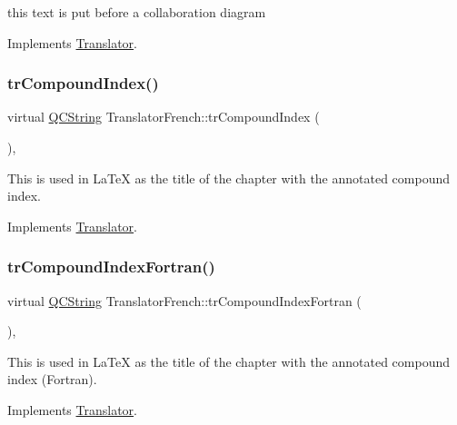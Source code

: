 this text is put before a collaboration diagram 

Implements \mbox{\hyperlink{class_translator}{Translator}}.

\mbox{\label{class_translator_french_ae4a5ec770e1f655200ba2b82a2a1a59b}} 
\subsubsection{\texorpdfstring{trCompoundIndex()}{trCompoundIndex()}}
{\footnotesize\ttfamily virtual \mbox{\hyperlink{class_q_c_string}{Q\+C\+String}} Translator\+French\+::tr\+Compound\+Index (\begin{DoxyParamCaption}{ }\end{DoxyParamCaption})\hspace{0.3cm}{\ttfamily [inline]}, {\ttfamily [virtual]}}

This is used in La\+TeX as the title of the chapter with the annotated compound index. 

Implements \mbox{\hyperlink{class_translator}{Translator}}.

\mbox{\label{class_translator_french_af860f0f85d95e8ce648d7bc44324b022}} 
\subsubsection{\texorpdfstring{trCompoundIndexFortran()}{trCompoundIndexFortran()}}
{\footnotesize\ttfamily virtual \mbox{\hyperlink{class_q_c_string}{Q\+C\+String}} Translator\+French\+::tr\+Compound\+Index\+Fortran (\begin{DoxyParamCaption}{ }\end{DoxyParamCaption})\hspace{0.3cm}{\ttfamily [inline]}, {\ttfamily [virtual]}}

This is used in La\+TeX as the title of the chapter with the annotated compound index (Fortran). 

Implements \mbox{\hyperlink{class_translator}{Translator}}.

\mbox{\label{class_translator_french_a7cfc2390b7696fcd2e0c203edd31ba2f}} 
